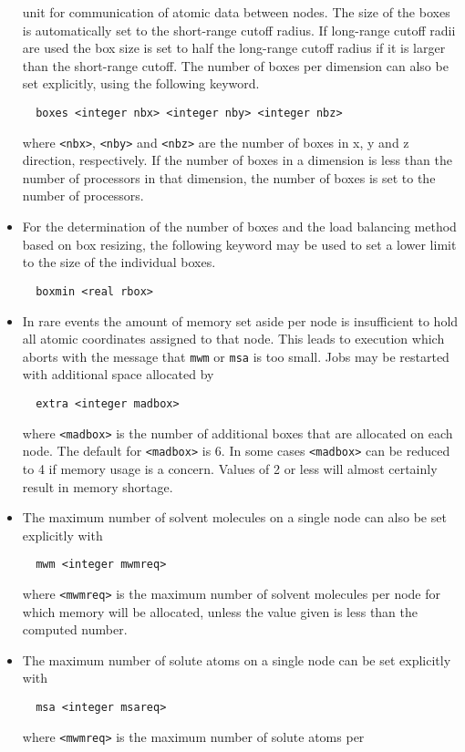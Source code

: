 \begin{itemize}
unit for communication of atomic data between nodes. The size of the
boxes is automatically set to the short-range cutoff radius. If
long-range cutoff radii  are used the box size is set to half the
long-range cutoff radius if it is larger than the short-range cutoff.
The number of boxes per dimension can also be set explicitly, using
the following keyword.
\begin{verbatim}
  boxes <integer nbx> <integer nby> <integer nbz>
\end{verbatim}
where \verb+<nbx>+, \verb+<nby>+ and \verb+<nbz>+ are the number of
boxes in x, y and z direction, respectively.
If the number of boxes in a dimension is less than the number of
processors in that dimension, the number of boxes is set to the number
of processors.
\item
For the determination of the number of boxes and the load balancing method
based on box resizing, the following keyword may be used to set a lower
limit to the size of the individual boxes.
\begin{verbatim}
  boxmin <real rbox>
\end{verbatim}
\item
In rare events the amount of memory set aside per node is insufficient
to hold all atomic coordinates assigned to that node. This leads to 
execution which aborts with the message that {\tt mwm} or {\tt msa} is too
small. Jobs may be restarted with additional space allocated by
\begin{verbatim}
  extra <integer madbox>
\end{verbatim}
where \verb+<madbox>+ is the number of additional boxes that are allocated
on each node. The default for \verb+<madbox>+ is 6. 
In some cases \verb+<madbox>+ can be reduced to 4 if memory usage is a
concern. Values of 2 or less will almost certainly result in memory 
shortage.
\item
The maximum number of solvent molecules on a single node can also be
set explicitly with
\begin{verbatim}
  mwm <integer mwmreq>
\end{verbatim}
where \verb+<mwmreq>+ is the maximum number of solvent molecules per
node for which memory will be allocated, unless the value given is 
less than the computed number.
\item
The maximum number of solute atoms on a single node can be set
explicitly with
\begin{verbatim}
  msa <integer msareq>
\end{verbatim}
where \verb+<mwmreq>+ is the maximum number of solute atoms per

\end{itemize}
